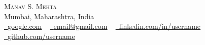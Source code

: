 \documentclass[letterpaper,11pt]{article}
\makeatletter
\newcommand{\resumeSubheading}[4]{
  \vspace{-2pt}\item
    \begin{tabular*}{1.0\textwidth}[t]{l@{\extracolsep{\fill}}r}
      \textbf{#1} & \textbf{\small #2} \\
      \textit{\small#3} & \textit{\small #4} \\
    \end{tabular*}\vspace{-7pt}
}
\newcommand{\resumeSubHeadingListStart}{\begin{itemize}[leftmargin=0.0in, label={}]}
\newcommand{\resumeSubHeadingListEnd}{\end{itemize}}
\makeatother
\begin{document}

\begin{center}
    {\Huge \scshape Manav S. Mehta} \\ \vspace{1pt}
    Mumbai, Maharashtra, India \\ \vspace{1pt}
%
    \href{https://google.com/}{\raisebox{-0.2\height}\faCompass\ \underline{google.com}} ~
    \href{mailto:x@gmail.com}{\raisebox{-0.2\height}\faEnvelope\  \underline{email@gmail.com}} ~ 
    \href{https://linkedin.com/in//}{\raisebox{-0.2\height}\faLinkedin\ \underline{linkedin.com/in/username}}  ~
    \href{https://github.com/}{\raisebox{-0.2\height}\faGithub\ \underline{github.com/username}}
    \vspace{-8pt}
\end{center}

%

%
%
\end{document}
